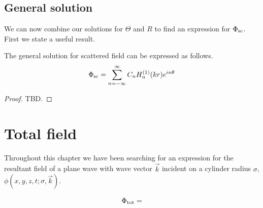\subsection{General solution}
We can now combine our solutions for $\Theta$ and $R$ to find an expression for $\Phi_{\text{sc}}$. First we state a useful result.
%
    \begin{propn} The general solution for scattered field can be expressed as follows.
        \begin{equation*}
            \Phi_{\text{sc}} = \sum^\infty_{n=-\infty} C_n H_n^{(1)}(kr)e^{in\theta}
        \end{equation*}
    \end{propn}
    \begin{proof} TBD.
    \end{proof}
\section{Total field}
Throughout this chapter we have been searching for an expression for the resultant field of a plane wave with wave vector $\vec{k}$ incident on a cylinder radius $\sigma$, $\phi(x,y,z,t;\sigma, \vec{k})$.\par
%
    \begin{propn}
        \begin{equation*}
            \Phi_{\text{tot}} =
        \end{equation*}
    \end{propn}
